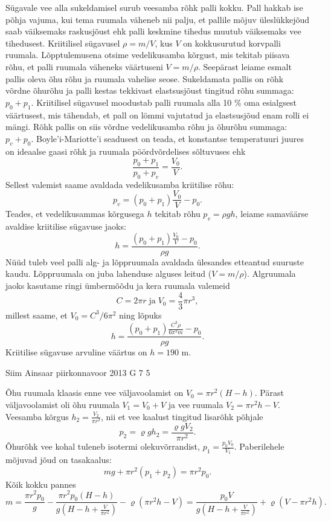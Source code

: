 \documentclass[11pt]{article}
\begin{document}
{{\ifSolution
Sügavale vee alla sukeldamisel surub veesamba rõhk palli kokku. Pall hakkab ise põhja vajuma, kui tema ruumala väheneb nii palju, et pallile mõjuv üleslükkejõud saab väiksemaks raskusjõust ehk palli keskmine tihedus muutub väiksemaks vee tihedusest. Kriitilisel sügavusel $\rho=m/V$, kus $V$ on kokkusurutud korvpalli ruumala. Lõpptulemusena otsime vedelikusamba kõrgust, mis tekitab piisava rõhu, et palli ruumala väheneks väärtuseni $V=m/\rho$. Seepärast leiame esmalt pallis oleva õhu rõhu ja ruumala vahelise seose. Sukeldamata pallis on rõhk võrdne õhurõhu ja palli kestas tekkivast elastsusjõust tingitud rõhu summaga: $p_0+p_1$. Kriitilisel sügavusel moodustab palli ruumala alla 10 \% oma esialgsest väärtusest, mis tähendab, et pall on lömmi vajutatud ja elastsusjõud enam rolli ei mängi. Rõhk pallis on siis võrdne vedelikusamba rõhu ja õhurõhu summaga: $p_v+p_0$. Boyle'i-Mariotte'i seadusest on teada, et konstantse temperatuuri juures on ideaalse gaasi rõhk ja ruumala pöördvõrdelises sõltuvuses ehk
\[
\frac{p_0+p_1}{p_0+p_v}=\frac{V_0}{V}.
\]
Sellest valemist saame avaldada vedelikusamba kriitilise rõhu:
\[
p_v = (p_0+p_1) \frac{V_0}{V} - p_0.
\]
Teades, et vedelikusammas kõrgusega $h$ tekitab rõhu $p_v=\rho g h$, leiame samaväärse avaldise kriitilise sügavuse jaoks:
\[
h = \frac{(p_0+p_1) \frac{V_0}{V} - p_0}{\rho g}.
\]
Nüüd tuleb veel palli alg- ja lõppruumala avaldada ülesandes etteantud suuruste kaudu. Lõppruumala on juba lahenduse alguses leitud ($V=m/\rho$). Algruumala jaoks kasutame ringi ümbermõõdu ja kera ruumala valemeid
\[
C = 2\pi r \; \text{ja} \; V_0 = \frac{4}{3}\pi r^3,
\]
millest saame, et $V_0=C^3/6\pi^2$ ning lõpuks
\[
h = \frac{(p_0+p_1) \frac{C^3 \rho}{6\pi^2 m} - p_0}{\rho g}.
\]
Kriitilise sügavuse arvuline väärtus on $h=190$ m.
\fi
}

{Siim Ainsaar} %
{piirkonnavoor} %
{2013} %
{G 7} %
{5} %
{

\ifSolution
Õhu ruumala klaasis enne vee väljavoolamist on 
$V_0 = \pi r^2 (H-h)$.
Pärast väljavoolamist oli õhu ruumala
$V_1 = V_0 + V$
ja vee ruumala
$V_2 = \pi r^2 h - V$.
Veesamba kõrgus
$h_2 = \frac{ V_2 }{ \pi r^2 }$,
nii et vee kaalust tingitud lisarõhk põhjale
\[
p_2 = \varrho g h_2 = \frac{ \varrho g V_2 }{ \pi r^2 }.
\]
Õhurõhk vee kohal tuleneb isotermi olekuvõrrandist,
$p_1 = \frac{p_0 V_0}{V_1}$.
Paberilehele mõjuvad jõud on tasakaalus:
\[
mg + \pi r^2 (p_1 + p_2) = \pi r^2 p_0.
\]
Kõik kokku pannes
\[ m =
\frac{ \pi r^2 p_0 }{ g } -
\frac{ \pi r^2 p_0 (H-h) }{ g \left( H - h + \frac{V}{\pi r^2} \right) } -
\varrho \left( \pi r^2 h - V \right)
=
\frac{ p_0 V }{ g \left( H - h + \frac{V}{ \pi r^2 } \right) } + \varrho \left( V - \pi r^2 h \right).
\]
\fi
}

}
\end{document}
